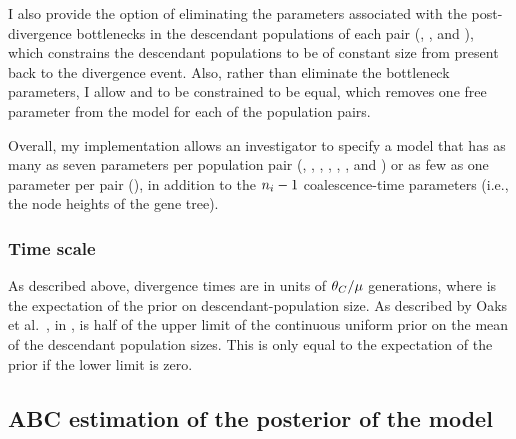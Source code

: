 I also provide the option of eliminating the parameters associated with the
post-divergence bottlenecks in the descendant populations of each pair
(\bottleTime{}, , and ),
which constrains the descendant populations to be of
constant size from present back to the divergence event.
Also, rather than eliminate the bottleneck parameters,
I allow  and  to be constrained to be
equal, which removes one free parameter from the model for each of the
population pairs.

Overall, my implementation allows an investigator to specify a model that has
as many as seven parameters per population pair
(\ancestralTheta{}, , ,
\bottleTime{}, , , and
\migrationRate{})
or as few as one parameter per pair
(\myTheta{}),
in addition to the $\popSampleSize{i}{} - 1$ coalescence-time parameters
(i.e., the node heights of the gene tree).

\subsubsection{Time scale}
As described above, divergence times are in units of
$\theta_{C}/\mu$ generations, where  is the expectation
of the prior on descendant-population size.
As described by Oaks et al.\ \cite{Oaks2012}, in \msb,  is half of
the upper limit of the continuous uniform prior on the mean of the descendant
population sizes.
This is only equal to the expectation of the prior if the lower limit is zero.

\subsection{ABC estimation of the posterior of the model}
